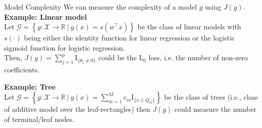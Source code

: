 \documentclass[aspectratio=169]{../latex_main/tntbeamer}  %
\begin{document}
\begin{frame}{Model Complexity}
We can measure the complexity of a model $g$ using $J(g)$. \\ 
\vspace{0.5cm}
 	\textbf{Example: Linear model}\\
 	Let $\mathcal{G} = \left\{g: \mathcal{X} \to \mathbb{R} ~|~g(x) = s(w^\top x)\right\}$ be the class of linear models with $s(\cdot)$ being either the identity function for linear regression or the logistic sigmoid function for logistic regression. \\
 	Then, $J(g) = \sum_{j = 1}^p \mathrm{I}_{\{ \theta_j \neq 0 \}}$ could be the L$_0$ loss, i.e. the number of non-zero coefficients. 
 	\vspace{0.5cm}
 	
 	\textbf{Example: Tree}\\
 	Let $\mathcal{G} = \left\{g:\mathcal{X} \to \mathbb{R} ~|~g(x) = \sum_{m=1}^M c_m \mathrm{I}_{\{ x \in Q_m \}}\right\}$ be the class of trees (i.e., class of additive model over the leaf-rectangles) then $J(g)$ could measure the number of terminal/leaf nodes.\\
 \end{frame}
\end{document}
